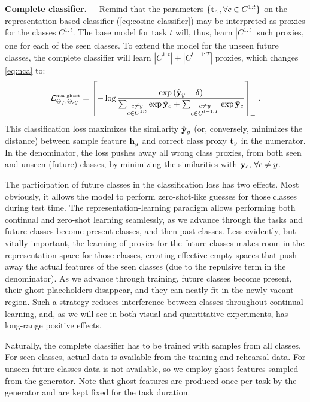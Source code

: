 \textbf{Complete classifier.~~} Remind that the parameters  $\{\mathbf{t}_c\,,\forall c \in C^{1:t}\}$ on
the representation-based classifier (\autoref{eq:cosine-classifier}) may be interpreted as proxies
for the classes $C^{1:t}$. The base model for task $t$ will, thus, learn $|C^{1:t}|$ such proxies,
one for each of the seen classes. To extend the model for the unseen future classes, the complete
classifier will learn $|C^{1:t}| + |C^{t+1:T}|$ proxies, which changes \autoref{eq:nca} to:
%
\begin{equation}
    \mathcal{L}^\text{\tiny{nca-ghost}}_{\Theta_f,\Theta_{\textit{clf}}} = \left[- \log\frac{\exp\left(\hat{\mathbf{y}}_y - \delta\right)}{\sum_{\substack{c \neq y\\c \in C^{1:t}}} \exp \hat{\mathbf{y}}_{c} + \sum_{\substack{c \neq y\\c \in C^{t+1:T}}} \exp \hat{\mathbf{y}}_{c}} \right]_+ \,.
    \label{eq:nca-ghost}
\end{equation}
%
This classification loss maximizes the similarity $\hat{\mathbf{y}}_y$ (or, conversely, minimizes the distance)
between sample feature $\mathbf{h}_y$ and correct class proxy $\mathbf{t}_y$ in the numerator. In the denominator,
the loss pushes away all wrong class proxies, from both seen and unseen (future) classes, by
minimizing the similarities with $\mathbf{y}_c, \, \forall c \neq y$.

The participation of future classes in the classification loss has two effects. Most obviously, it
allows the model to perform zero-shot-like guesses for those classes during test time. The
representation-learning paradigm allows performing both continual and zero-shot learning seamlessly,
as we advance through the tasks and future classes become present classes, and then past classes.
Less evidently, but vitally important, the learning of proxies for the future classes makes room in
the representation space for those classes, creating effective empty spaces that push away the
actual features of the seen classes (due to the repulsive term in the denominator). As we advance
through training, future classes become present, their ghost placeholders disappear, and they can
neatly fit in the newly vacant region. Such a strategy reduces interference between classes
throughout continual learning, and, as we will see in both visual and quantitative experiments, has
long-range positive effects.

Naturally, the complete classifier has to be trained with samples from all classes. For seen
classes, actual data is available from the training and rehearsal data. For unseen future classes
data is not available, so we employ ghost features sampled from the generator. Note that ghost
features are produced once per task by the generator and are kept fixed for the task duration.
\label{sec:ghost-classifier}

